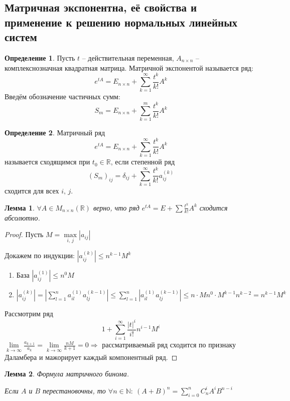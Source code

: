 \documentclass[a4paper,12pt]{article}
\renewcommand{\leq}{\ensuremath{\leqslant}}
\theoremstyle{plain}
\newtheorem{lemma}{Лемма}[section]
\theoremstyle{definition}
\newtheorem{definition}{Определение}[section]
\theoremstyle{remark}
\begin{document}
\subsection{Матричная экспонентна, её свойства и применение к решению нормальных линейных систем}
\begin{definition}
	Пусть $t$ -- действительная переменная, $A_{n \times n}$ -- комплекснозначная квадратная матрица. Матричной экспонентой называется ряд:
	\[e^{tA} = E_{n \times n} + \sum_{k = 1}^\infty \frac{t^k}{k!}A^k\]
	Введём обозначение частичных сумм:
	\[S_m = E_{n \times n} + \sum_{k = 1}^m \frac{t^k}{k!}A^k\]
\end{definition}

\begin{definition}
	Матричный ряд
	\[e^{tA} = E_{n \times n} + \sum_{k = 1}^\infty \frac{t^k}{k!}A^k\]
	называется сходящимся при $t_0 \in \mathbb{R}$, если степенной ряд
	\[(S_m)_{ij} = \delta_{ij} + \sum_{k = 1}^\infty \frac{t^k}{k!}a_{ij}^{(k)}\]
	сходится для всех $i,\,j$.
\end{definition}

\begin{lemma}
	$\forall A \in M_{n \times n}(\mathbb{R})$ верно, что ряд $e^{tA} = E + \sum \frac{t^k}{k!}A^k$ сходится абсолютно.
\end{lemma}

\begin{proof}
	Пусть $M = \max\limits_{i,\,j}|a_{ij}|$

	Докажем по индукции: $|a_{ij}^{(k)}| \leq n^{k-1}M^k$
	\begin{enumerate}
		\item База $|a_{ij}^{(1)}| \leq n^0M$
		\item $|a_{ij}^{(k)}| = |\sum_{l = 1}^n a_{il}^{(1)}a_{lj}^{(k-1)}| \leq \sum_{l = 1}^n |a_{il}^{(1)}a_{lj}^{(k-1)}| \leq n\cdot Mn^0\cdot M^{k - 1}n^{k-2} = n^{k-1}M^k$
	\end{enumerate}
	Рассмотрим ряд
	\[1 + \sum_{i = 1}^\infty \frac{|t|^i}{i!}n^{i - 1}M^i\]
	$\lim\limits_{k \to \infty} \frac{a_{k + 1}}{a_k} = \lim\limits_{k \to \infty} \frac{nM}{k + 1} = 0 \Rightarrow$ рассматриваемый ряд сходится по признаку Даламбера и мажорирует каждый компонентный ряд.
\end{proof}

\begin{lemma}
	Формула матричного бинома.

	Если $A$ и $B$ перестановочны, то $\forall n \in \mathbb{N}:\: (A + B)^n = \sum_{i = 0}^n C_n^iA^iB^{n - i}$
\end{lemma}
\end{document}

